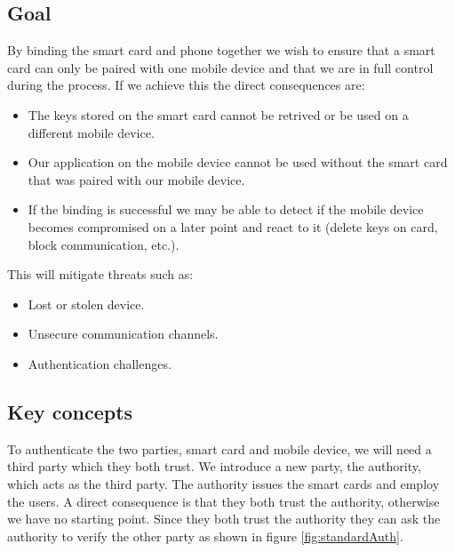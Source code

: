 \subsection{Goal}
By binding the smart card and phone together we wish to ensure that a smart card can only be paired with one mobile device and that we are in full control during the process. If we achieve this the direct consequences are:
\begin{itemize}
  \item The keys stored on the smart card cannot be retrived or be used on a different mobile device.
  \item Our application on the mobile device cannot be used without the smart card that was paired with our mobile device.
  \item If the binding is successful we may be able to detect if the mobile device becomes compromised on a later point and react to it (delete keys on card, block communication, etc.).
\end{itemize}

This will mitigate threats such as:
\begin{itemize}
  \item Lost or stolen device.
  \item Unsecure communication channels.
  \item Authentication challenges.
\end{itemize}

\subsection{Key concepts}
To authenticate the two parties, smart card and mobile device, we will need a third party which they both trust. We introduce a new party, the authority, which acts as the third party. The authority issues the smart cards and employ the users. A direct consequence is that they both trust the authority, otherwise we have no starting point. Since they both trust the authority they can ask the authority to verify the other party as shown in figure \ref{fig:standardAuth}.

